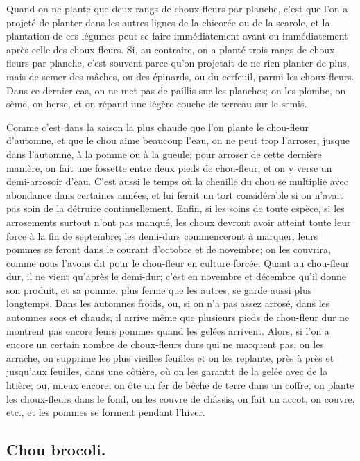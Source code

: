 \documentclass[10pt,a4paper]{book}
\begin{document}
Quand on ne plante que deux rangs de choux-fleurs par planche, c'est que l'on a projeté de planter dans les autres lignes de la chicorée ou de la scarole, et la plantation de ces légumes peut se faire immédiatement avant ou immédiatement après celle des choux-fleurs. Si, au contraire, on a planté trois rangs de choux-fleurs par planche, c'est souvent parce qu'on projetait de ne rien planter de plus, mais de semer des mâches, ou des épinards, ou du cerfeuil, parmi les choux-fleurs. Dans ce dernier cas, on ne met pas de paillis sur les planches; on les plombe, on sème, on herse, et on répand une légère couche de terreau sur le semis.

Comme c'est dans la saison la plus chaude que l'on plante le chou-fleur d'automne, et que le chou aime beaucoup l'eau, on ne peut trop l'arroser, jusque dans l'automne, à la pomme ou à la gueule; pour arroser de cette dernière manière, on fait une fossette entre deux pieds de chou-fleur, et on y verse un demi-arrosoir d'eau. C'est aussi le temps où la chenille du chou se multiplie avec abondance dans certaines années, et lui ferait un tort considérable si on n'avait pas soin de la détruire continuellement. Enfin, si les soins de toute espèce, si les arrosements surtout n'ont pas manqué, les choux devront avoir atteint toute leur force à la fin de septembre; les demi-durs commenceront à marquer, leurs pommes se feront dans le courant d'octobre et de novembre; on les couvrira, comme nous l'avons dit pour le chou-fleur en culture forcée. Quant au chou-fleur dur, il ne vient qu'après le demi-dur; c'est en novembre et décembre qu'il donne son produit, et sa pomme, plus ferme que les autres, se garde aussi plus longtemps. Dans les automnes froids, ou, si on n'a pas assez arrosé, dans les automnes secs et chauds, il arrive même que plusieurs pieds de chou-fleur dur ne montrent pas encore leurs pommes quand les gelées arrivent. Alors, si l'on a encore un certain nombre de choux-fleurs durs qui ne marquent pas, on les arrache, on supprime les plus vieilles feuilles et on les replante, près à près et jusqu'aux feuilles, dans une côtière, où on les garantit de la gelée avec de la litière; ou, mieux encore, on ôte un fer de bêche de terre dans un coffre, on plante les choux-fleurs dans le fond, on les couvre de châssis, on fait un accot, on couvre, etc., et les pommes se forment pendant l'hiver.

\subsection{Chou brocoli.}
\end{document}
